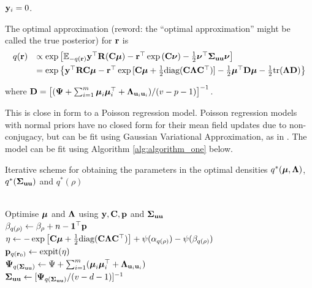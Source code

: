 \documentclass{amsart}[12pt]
\newcommand{\joc}[1]{{\color{red}#1}}
\begin{document}
\noindent 
{} ${\bf y}_i = 0$.


\noindent The optimal approximation \joc{(reword: the ``optimal approximation'' might be called the true posterior)} for ${\bf r}$ is
$$
\begin{array}{rl}
	q({\bf r}) & \propto \exp \left [ {\mathbb E}_{-q({\bf r})}{\bf y}^\top{\bf R}({\bf C}{\boldsymbol \mu}) - {\bf r}^\top\exp{({\bf C}{\boldsymbol\nu})}-\tfrac{1}{2} {\boldsymbol \nu}^\top {\boldsymbol\Sigma}_{{\bf u} {\bf u}} {\boldsymbol \nu} \right ]                                                  \\ [1ex]
	       & = \exp{ \left\{ {\bf y}^\top{\bf R}{\bf C}{\boldsymbol\mu}- {\bf r}^\top \exp{[{\bf C}{\boldsymbol\mu}+  \tfrac{1}{2} \text{diag}({\bf C}{\boldsymbol\Lambda}{\bf C}^\top)]} -  \tfrac{1}{2} {\boldsymbol\mu}^\top {\bf D}{\boldsymbol\mu}-  \tfrac{1}{2} \text{tr}({\boldsymbol\Lambda}{\bf D}) \right\} } 
\end{array}
$$

\noindent where ${\bf D} = \left[ ({\boldsymbol \Psi} + \sum_{i=1}^m {\boldsymbol \mu}_i {\boldsymbol \mu}_i^\top + {\boldsymbol \Lambda}_{{\bf u}_i{\bf u}_i}) / (v - p - 1) \right]^{-1}$. 

\noindent This is close in form to a Poisson regression model. Poisson regression models with normal priors
have no closed form for their mean field updates due to non- conjugacy, but can be fit using Gaussian
Variational Approximation, as in \citep{ormerod09}. The model can be fit using Algorithm
\ref{alg:algorithm_one} below.

\begin{algorithm}
	\caption[Algorithm 1]{Iterative scheme for obtaining the parameters in the
		optimal densities $q^*({\boldsymbol \mu}, {\boldsymbol \Lambda})$, $q^*({\boldsymbol \Sigma}_{{\bf u} {\bf u}})$ and $q^*(\rho)$}
	\label{alg:algorithm_one}
	\begin{algorithmic}
		 \\[1ex]
		\STATE Optimise ${\boldsymbol \mu}$ and ${\boldsymbol \Lambda}$ using ${\bf y}, {\bf C}, {\bf p}$ and ${\boldsymbol \Sigma}_{{\bf u} {\bf u}}$ \\[1ex]
		\STATE $\beta_{q(\rho)} \leftarrow \beta_\rho + n - {\bf 1}^\top{\bf p}$ \\[1ex]
		\STATE $\eta \leftarrow -\exp \left [ {\bf C} {\boldsymbol \mu} + \tfrac{1}{2} \text{diag}{({\bf C}{\boldsymbol\Lambda}{\bf C}^\top)} \right ] + \psi{(\alpha_{q{(\rho)}})} - \psi{(\beta_{q{(\rho)}})}$ \\[1ex]
			\STATE ${\bf p}_{q({\bf r}_0)} \leftarrow \text{expit} (\eta)$ \\[1ex]
			\STATE ${\boldsymbol \Psi}_{q({\boldsymbol \Sigma}_{{\bf u} {\bf u}})} \leftarrow \Psi + \sum_{i=1}^m ({\boldsymbol \mu}_i {\boldsymbol \mu}_i^\top + {\boldsymbol \Lambda}_{{{\bf u}}_i {{\bf u}}_i})$ \\[1ex]
			\STATE ${\boldsymbol \Sigma}_{{\bf u}{\bf u}} \leftarrow [{\boldsymbol \Psi}_{q({\boldsymbol \Sigma}_{{\bf u} {\bf u}})}/(v - d - 1)]^{-1}$
			\ENDWHILE
		\end{algorithmic}
	\end{algorithm}
			
\end{document}
